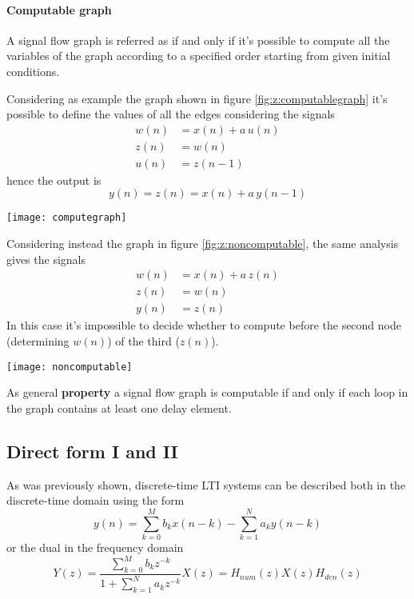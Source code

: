 		\paragraph{Computable graph} A signal flow graph is referred as  if and only if it's possible to compute all the variables of the graph according to a specified order starting from given initial conditions.
		
		Considering as example the graph shown in figure \ref{fig:z:computablegraph} it's possible to define the values of all the edges considering the signals
		\begin{align*}
			w(n) & = x(n) + a \, u(n) \\ z(n) & = w(n) \\ u(n) & = z(n-1) 
		\end{align*}
		hence the output is
		\[y(n) = z(n) = x(n) + a \,y(n-1)\]		
		\begin{SCfigure}[2][bht]
			\centering \texttt{[image: computegraph]}
			\caption{example of computable flow graph.} \label{fig:z:computablegraph}
		\end{SCfigure}
		
		Considering instead the graph in figure \ref{fig:z:noncomputable}, the same analysis gives the signals
		\begin{align*}
			w(n) & = x(n) + a\,z(n) \\ z(n) & = w(n) \\ y(n) & = z(n)
		\end{align*}
		In this case it's impossible to decide whether to compute before the second node (determining $w(n)$) of the third ($z(n)$).	
		\begin{SCfigure}[2][bht]
			\centering \texttt{[image: noncomputable]}
			\caption{example of non-computable flow graph.} \label{fig:z:noncomputable}
		\end{SCfigure}
		
		As general \textbf{property} a signal flow graph is computable if and only if each loop in the graph contains at least one delay element.		
		
	\subsection{Direct form I and II}
		As was previously shown, discrete-time LTI systems can be described both in the discrete-time domain using the form
		\[ y(n) = \sum_{k=0}^M b_k x(n-k) - \sum_{k=1}^N a_k y(n-k) \]
		or the dual in the frequency domain
		\[ Y(z) = \dfrac{\sum_{k=0}^{M}b_k z^{-k}}{ 1+ \sum_{k=1}^{N}a_k z^{-k}} X(z) = H_{num}(z) X(z) H_{den}(z) \]
		
